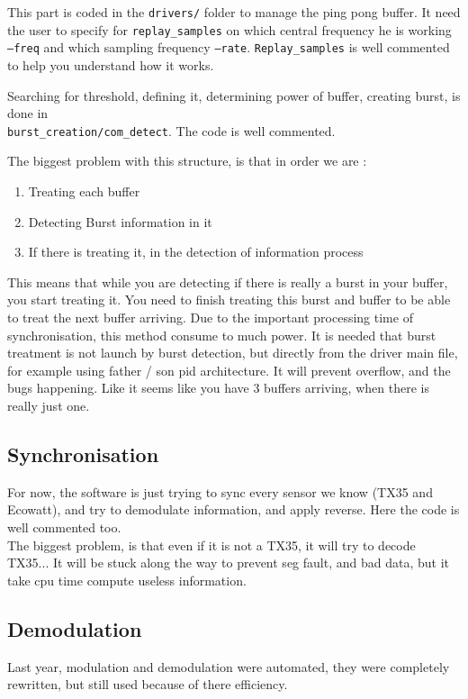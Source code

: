 This part is coded in the \texttt{drivers/} folder to manage the ping pong buffer. It need the user to specify for \texttt{replay\_samples} on which central frequency he is working \texttt{--freq} and which sampling frequency \texttt{--rate}. \texttt{Replay\_samples} is well commented to help you understand how it works.

Searching for threshold, defining it, determining power of buffer, creating burst, is done in \\\texttt{burst\_creation/com\_detect}. The code is well commented.

The biggest problem with this structure, is that in order we are :
\begin{enumerate}
\item Treating each buffer
\item Detecting Burst information in it
\item If there is treating it, in the detection of information process
\end{enumerate}
This means that while you are detecting if there is really a burst in your buffer, you start treating it. You need to finish treating this burst and buffer to be able to treat the next buffer arriving. Due to the important processing time of synchronisation, this method consume to much power. It is needed that burst treatment is not launch by burst detection, but directly from the driver main file, for example using father / son pid architecture. It will prevent overflow, and the bugs happening. Like it seems like you have 3 buffers arriving, when there is really just one.
\subsection{Synchronisation}
For now, the software is just trying to sync every sensor we know (TX35 and Ecowatt), and try to demodulate information, and apply reverse. Here the code is well commented too.\\
The biggest problem, is that even if it is not a TX35, it will try to decode TX35... It will be stuck along the way to prevent seg fault, and bad data, but it take cpu time compute useless information.

\subsection{Demodulation}
Last year, modulation and demodulation were automated, they were completely rewritten, but still used because of there efficiency.

